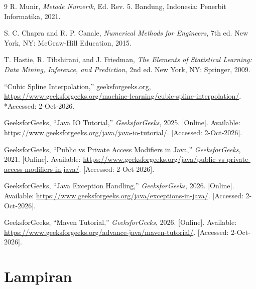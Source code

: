 \documentclass{article}
\begin{document}
\begin{itemize}
\begin{thebibliography}{9}
R. Munir, \textit{Metode Numerik}, Ed. Rev. 5. Bandung, Indonesia: Penerbit Informatika, 2021.

S. C. Chapra and R. P. Canale, \textit{Numerical Methods for Engineers}, 7th ed. New York, NY: McGraw-Hill Education, 2015.

T. Hastie, R. Tibshirani, and J. Friedman, \textit{The Elements of Statistical Learning: Data Mining, Inference, and Prediction}, 2nd ed. New York, NY: Springer, 2009.

``Cubic Spline Interpolation,'' geeksforgeeks.org, \url{https://www.geeksforgeeks.org/machine-learning/cubic-spline-interpolation/}. *Accessed: 2-Oct-2026.


GeeksforGeeks, ``Java IO Tutorial,'' \textit{GeeksforGeeks}, 2025. [Online]. Available: \url{https://www.geeksforgeeks.org/java/java-io-tutorial/}. [Accessed: 2-Oct-2026].


GeeksforGeeks, ``Public vs Private Access Modifiers in Java,'' \textit{GeeksforGeeks}, 2021. [Online]. Available: \url{https://www.geeksforgeeks.org/java/public-vs-private-access-modifiers-in-java/}. [Accessed: 2-Oct-2026].


GeeksforGeeks, ``Java Exception Handling,'' \textit{GeeksforGeeks}, 2026. [Online]. Available: \url{https://www.geeksforgeeks.org/java/exceptions-in-java/}. [Accessed: 2-Oct-2026].


GeeksforGeeks, ``Maven Tutorial,'' \textit{GeeksforGeeks}, 2026. [Online]. Available: \url{https://www.geeksforgeeks.org/advance-java/maven-tutorial/}. [Accessed: 2-Oct-2026].

\end{thebibliography}

\section{Lampiran}



\vspace{0.4cm}



\end{itemize}
\end{document}
